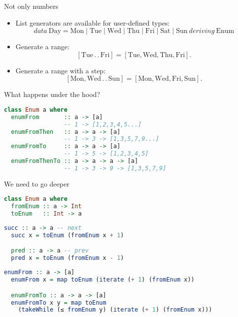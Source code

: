 \documentclass[handout]{beamer}
\def\dd{\,.\,.\,}
\begin{document}
\begin{frame}{Not only numbers}

\begin{itemize}[<+->]

\item List generators are available for user-defined types:
$$
data~ \text{Day} =
\text{Mon} \mid \text{Tue} \mid \text{Wed} \mid \text{Thu} \mid \text{Fri} \mid \text{Sat} \mid \text{Sun}
{~deriving~} \text{Enum}
$$

\item Generate a range:
$$
[\text{Tue}\dd \text{Fri}] = [\text{Tue}, \text{Wed}, \text{Thu}, \text{Fri}].
$$

\item Generate a range with a step:
$$
[\text{Mon},\text{Wed}\dd\text{Sun}] = [\text{Mon},\text{Wed},\text{Fri},\text{Sun}].
$$

\end{itemize}

\end{frame}

\begin{frame}[fragile]{What happens under the hood?}

\begin{lstlisting}[language=Haskell]
class Enum a where
  enumFrom       :: a -> [a]
                 -- 1 -> [1,2,3,4,5...]
  enumFromThen   :: a -> a -> [a]
                 -- 1 -> 3 -> [1,3,5,7,9...]
  enumFromTo     :: a -> a -> [a]
                 -- 1 -> 5 -> [1,2,3,4,5]
  enumFromThenTo :: a -> a -> a -> [a]
                 -- 1 -> 3 -> 9 -> [1,3,5,7,9]
\end{lstlisting}

\end{frame}

\begin{frame}[fragile]{We need to go deeper}

\begin{lstlisting}[language=Haskell]
class Enum a where
  fromEnum :: a -> Int
  toEnum   :: Int -> a
\end{lstlisting} \pause
\begin{lstlisting}[language=Haskell]
  succ :: a -> a -- next
  succ x = toEnum (fromEnum x + 1)

  pred :: a -> a -- prev
  pred x = toEnum (fromEnum x - 1)
\end{lstlisting} \pause
\begin{lstlisting}[language=Haskell]
  enumFrom :: a -> [a]
  enumFrom x = map toEnum (iterate (+ 1) (fromEnum x))

  enumFromTo :: a -> a -> [a]
  enumFromTo x y = map toEnum
    (takeWhile (≤ fromEnum y) (iterate (+ 1) (fromEnum x)))
\end{lstlisting}

\end{frame}
\end{document}
